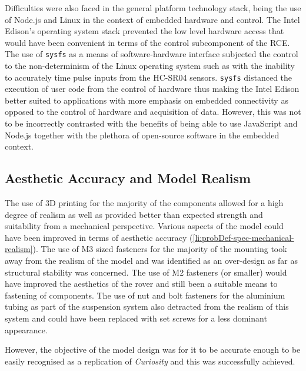     Difficulties were also faced in the general platform technology stack, being the use of Node.js and Linux in the context of embedded hardware and control. The Intel Edison's operating system stack prevented the low level hardware access that would have been convenient in terms of the control subcomponent of the RCE. The use of \texttt{sysfs} as a means of software-hardware interface subjected the control to the non-determinism of the Linux operating system such as with the inability to accurately time pulse inputs from the HC-SR04 sensors. \texttt{sysfs} distanced the execution of user code from the control of hardware thus making the Intel Edison better suited to applications with more emphasis on embedded connectivity as opposed to the control of hardware and acquisition of data. However, this was not to be incorrectly contrasted with the benefits of being able to use JavaScript and Node.js together with the plethora of open-source software in the embedded context.
  
  \subsection{Aesthetic Accuracy and Model Realism}
  \label{subsec:rec-aesthetics}
    The use of 3D printing for the majority of the components allowed for a high degree of realism as well as provided better than expected strength and suitability from a mechanical perspective. Various aspects of the model could have been improved in terms of aesthetic accuracy (\ref{li:probDef-spec-mechanical-realism}). The use of M3 sized fasteners for the majority of the mounting took away from the realism of the model and was identified as an over-design as far as structural stability was concerned. The use of M2 fasteners (or smaller) would have improved the aesthetics of the rover and still been a suitable means to fastening of components. The use of nut and bolt fasteners for the aluminium tubing as part of the suspension system also detracted from the realism of this system and could have been replaced with set screws for a less dominant appearance.
    
    However, the objective of the model design was for it to be accurate enough to be easily recognised as a replication of \textit{Curiosity} and this was successfully achieved.
  